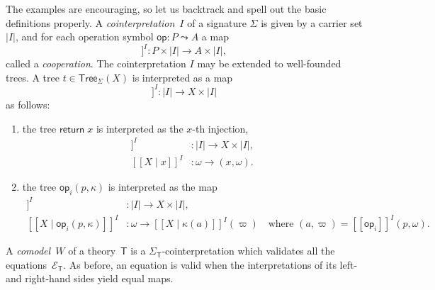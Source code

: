 \documentclass{amsart}
\newcommand{\theory}[1]{\mathsf{#1}} %
\newcommand{\signature}[1]{\Sigma_{\theory{#1}}} %
\newcommand{\equations}[1]{\mathcal{E}_{\theory{#1}}} %
\newcommand{\carrier}[1]{|#1|} %
\newcommand{\Tree}[2]{\mathsf{Tree}_{#1}(#2)} %
\newcommand{\leaf}[1]{\return{#1}} %
\newcommand{\op}[1]{\mathsf{op}_{#1}} %
\newcommand{\opdecl}[3]{#1 : #2 \leadsto #3} %
\newcommand{\sem}[1]{[\![#1]\!]} %
\newcommand{\kode}[1]{\mathsf{#1}}
\newcommand{\return}[1]{\kode{return}\;#1}
\begin{document}
The examples are encouraging, so let us backtrack and spell out the basic
definitions properly. A \emph{cointerpretation}~$I$ of a signature $\Sigma$ is
given by a carrier set $\carrier{I}$, and for each operation symbol $\opdecl{\kode{op}}{P}{A}$
a map
%
\begin{equation*}
  \sem{\kode{op}}^I : P \times \carrier{I} \to A \times \carrier{I},
\end{equation*}
%
called a \emph{cooperation}. The cointerpretation $I$ may be extended to
well-founded trees. A tree $t \in \Tree{\Sigma}{X}$ is interpreted as a map
%
\begin{equation*}
  \sem{t}^I : \carrier{I} \to X \times \carrier{I}
\end{equation*}
%
as follows:
%
\begin{enumerate}
\item the tree $\leaf{x}$ is interpreted as the $x$-th injection,
  \begin{align*}
    \sem{X \mid x}^I &: \carrier{I} \to X \times \carrier{I},\\
    \sem{X \mid x}^I &: \omega \to (x, \omega).
  \end{align*}
\item the tree $\op{i}(p, \kappa)$ is interpreted as the map
  \begin{align*}
    \sem{X \mid \op{i}(p, \kappa)}^I &: \carrier{I} \to X \times \carrier{I},\\
    \sem{X \mid \op{i}(p, \kappa)}^I &: \omega \to
         \sem{X \mid \kappa(a)}^I(\varpi)
         \quad\text{where $(a, \varpi) = \sem{\op{i}}^{I}(p, \omega)$.}
  \end{align*}
\end{enumerate}
%
A \emph{comodel~$W$} of a theory~$\theory{T}$ is a
$\signature{T}$-cointerpretation which validates all the
equations~$\equations{T}$. As before, an equation is valid when the
interpretations of its left- and right-hand sides yield equal maps.
\end{document}

